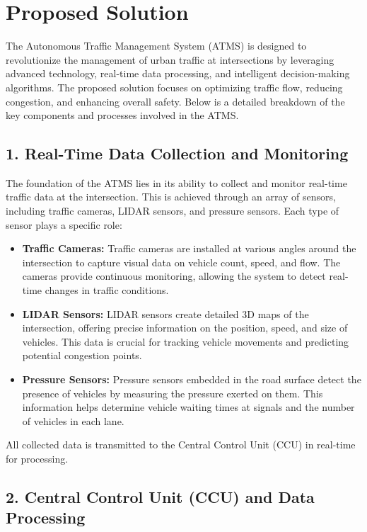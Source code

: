 \documentclass{scrreprt}
\begin{document}
\section*{Proposed Solution}

The Autonomous Traffic Management System (ATMS) is designed to revolutionize the management of urban traffic at intersections by leveraging advanced technology, real-time data processing, and intelligent decision-making algorithms. The proposed solution focuses on optimizing traffic flow, reducing congestion, and enhancing overall safety. Below is a detailed breakdown of the key components and processes involved in the ATMS.

\subsection*{1. Real-Time Data Collection and Monitoring}

The foundation of the ATMS lies in its ability to collect and monitor real-time traffic data at the intersection. This is achieved through an array of sensors, including traffic cameras, LIDAR sensors, and pressure sensors. Each type of sensor plays a specific role:

\begin{itemize}
    \item \textbf{Traffic Cameras:} 
    Traffic cameras are installed at various angles around the intersection to capture visual data on vehicle count, speed, and flow. The cameras provide continuous monitoring, allowing the system to detect real-time changes in traffic conditions.

    \item \textbf{LIDAR Sensors:} 
    LIDAR sensors create detailed 3D maps of the intersection, offering precise information on the position, speed, and size of vehicles. This data is crucial for tracking vehicle movements and predicting potential congestion points.

    \item \textbf{Pressure Sensors:} 
    Pressure sensors embedded in the road surface detect the presence of vehicles by measuring the pressure exerted on them. This information helps determine vehicle waiting times at signals and the number of vehicles in each lane.
\end{itemize}

All collected data is transmitted to the Central Control Unit (CCU) in real-time for processing.

\subsection*{2. Central Control Unit (CCU) and Data Processing}
\end{document}
